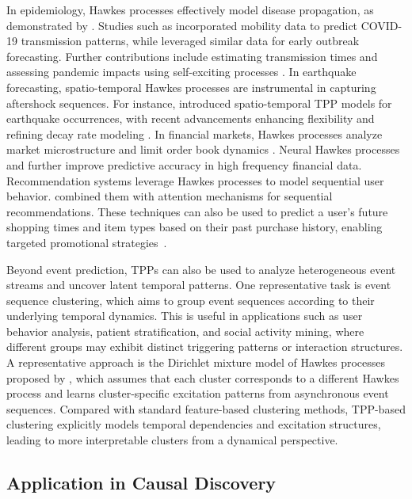 \documentclass[10pt]{article} %
\begin{document}
In epidemiology, Hawkes processes effectively model disease propagation, as demonstrated by \citet{rizoiu2018sir}. Studies such as \citet{chiang2022hawkes} incorporated mobility data to predict COVID-19 transmission patterns, while \citet{schwabe2021predicting} leveraged similar data for early outbreak forecasting. Further contributions include estimating transmission times \citep{schoenberg2023estimating} and assessing pandemic impacts using self-exciting processes \citep{giudici2023network}.
In earthquake forecasting, spatio-temporal Hawkes processes are instrumental in capturing aftershock sequences. For instance, \citet{ogata1998space} introduced spatio-temporal TPP models for earthquake occurrences, with recent advancements enhancing flexibility \citep{kwon2023flexible} and refining decay rate modeling \citep{davis2024fractional}.
In financial markets, Hawkes processes analyze market microstructure and limit order book dynamics \citep{chen2022hawkes}. Neural Hawkes processes \citep{shi2022state} and \citep{nystrom2022hawkes} further improve predictive accuracy in high frequency financial data.
Recommendation systems leverage Hawkes processes to model sequential user behavior. 
\citet{wang2021sequential} combined them with attention mechanisms for sequential recommendations. 
These techniques can also be used to predict a user’s future shopping times and item types based on their past purchase history, enabling targeted promotional strategies~\citep{mei2017neural,meng2024interpretable}. 

Beyond event prediction, TPPs can also be used to analyze heterogeneous event streams and uncover latent temporal patterns. One representative task is event sequence clustering, which aims to group event sequences according to their underlying temporal dynamics. This is useful in applications such as user behavior analysis, patient stratification, and social activity mining, where different groups may exhibit distinct triggering patterns or interaction structures. 
A representative approach is the Dirichlet mixture model of Hawkes processes proposed by \citet{xu2017dirichlet}, which assumes that each cluster corresponds to a different Hawkes process and learns cluster-specific excitation patterns from asynchronous event sequences. Compared with standard feature-based clustering methods, TPP-based clustering explicitly models temporal dependencies and excitation structures, leading to more interpretable clusters from a dynamical perspective. 



\subsection{Application in Causal Discovery}
\label{application_causal}
\end{document}
